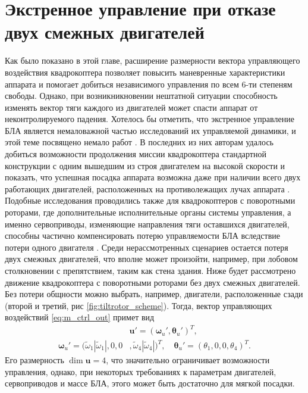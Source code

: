 \section{Экстренное управление при отказе двух смежных двигателей}
\label{section_em_ctrl}

Как было показано в этой главе, расширение размерности вектора управляющего воздействия квадрокоптера позволяет повысить маневренные характеристики аппарата и помогает добиться независимого управления по всем 6-ти степеням свободы.
Однако, при возникникновении нештатной ситуации способность изменять вектор тяги каждого из двигателей может спасти аппарат от неконтролируемого падения.
Хотелось бы отметить, что экстренное управление БЛА является немаловажной частью исследований их управляемой динамики, и этой теме посвящено немало работ \cite{Morozov01, Lippiello01, Mueller01}. В последних из них авторам удалось добиться возможности продолжения миссии квадрокоптера стандартной конструкции с одним вышедшим из строя двигателем на высокой скорости \cite{Sun01} и показать, что успешная посадка аппарата возможна даже при наличии всего двух работающих двигателей, расположенных на противолежащих лучах аппарата \cite{Gomes01}. Подобные исследования проводились также для квадрокоптеров с поворотными роторами, где дополнительные исполнительные органы системы управления, а именно сервоприводы, изменяющие направления тяги оставшихся двигателей, способны частично компенсировать потерю управляемости БЛА вследствие потери одного двигателя \cite{Nemati02}.
Среди нерассмотренных сценариев остается потеря двух смежных двигателей, что вполне может произойти, например, при лобовом столкновении с препятствием, таким как стена здания. Ниже будет рассмотрено движение квадрокоптера с поворотными роторами без двух смежных двигателей.
Без потери общности можно выбрать, например, двигатели, расположенные сзади (второй и третий, рис \ref{fig:tiltrotor_scheme}). Тогда, вектор управляющих воздействий \eqref{eq:m_ctrl_out} примет вид
\begin{equation} \label{eq:em_ctrl_out}
\begin{aligned}
&\bm{u'} = (\bm \omega_u', \bm \theta_u')^T,
\\
\bm \omega_u' =
(\tilde\omega_1 |\tilde\omega_1|,
0,
0&,
\tilde\omega_4 |\tilde\omega_4|)^T,
\quad
\bm \theta_u' = (\theta_1, 0, 0, \theta_4 )^T.
\end{aligned}
\end{equation}
Его размерность $\dim \bm{u}=4$, что значительно ограничивает возможности управления, однако, при некоторых требованиях к параметрам двигателей, сервоприводов и массе БЛА, этого может быть достаточно для мягкой посадки. 

